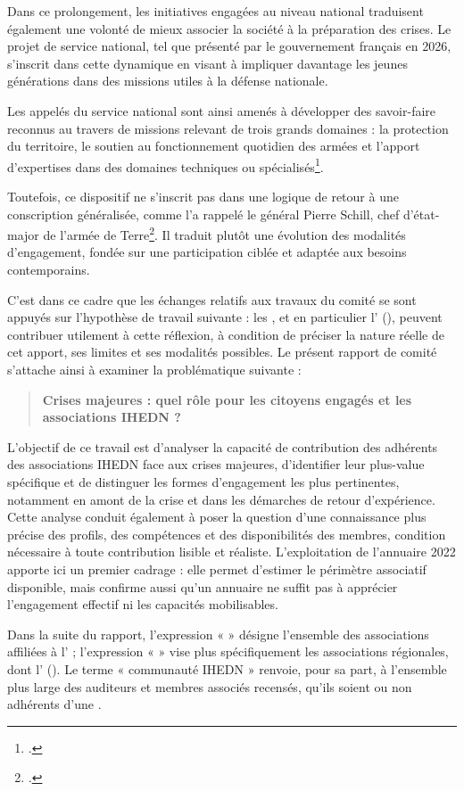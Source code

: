 Dans ce prolongement, les initiatives engagées au niveau national traduisent également une volonté de mieux associer la société à la préparation des crises. Le projet de service national, tel que présenté par le gouvernement français en 2026, s'inscrit dans cette dynamique en visant à impliquer davantage les jeunes générations dans des missions utiles à la défense nationale.

Les appelés du service national sont ainsi amenés à développer des savoir-faire reconnus au travers de missions relevant de trois grands domaines : la protection du territoire, le soutien au fonctionnement quotidien des armées et l'apport d'expertises dans des domaines techniques ou spécialisés\footcite{info_gouv_service_national}.

Toutefois, ce dispositif ne s'inscrit pas dans une logique de retour à une conscription généralisée, comme l'a rappelé le général Pierre Schill, chef d'état-major de l'armée de Terre\footcite{leparisien_schill_service_national}. Il traduit plutôt une évolution des modalités d'engagement, fondée sur une participation ciblée et adaptée aux besoins contemporains.

C'est dans ce cadre que les échanges relatifs aux travaux du comité se sont appuyés sur l'hypothèse de travail suivante : les \AssociationsUnionIHEDN, et en particulier l'\AssociationRegionaleIDF{} (\ARSeize), peuvent contribuer utilement à cette réflexion, à condition de préciser la nature réelle de cet apport, ses limites et ses modalités possibles. Le présent rapport de comité s'attache ainsi à examiner la problématique suivante :

\begin{quote}
\textbf{Crises majeures : quel rôle pour les citoyens engagés et les associations IHEDN ?}
\end{quote}

L'objectif de ce travail est d'analyser la capacité de contribution des adhérents des associations IHEDN face aux crises majeures, d'identifier leur plus-value spécifique et de distinguer les formes d'engagement les plus pertinentes, notamment en amont de la crise et dans les démarches de retour d'expérience. Cette analyse conduit également à poser la question d'une connaissance plus précise des profils, des compétences et des disponibilités des membres, condition nécessaire à toute contribution lisible et réaliste. L'exploitation de l'annuaire 2022 apporte ici un premier cadrage : elle permet d'estimer le périmètre associatif disponible, mais confirme aussi qu'un annuaire ne suffit pas à apprécier l'engagement effectif ni les capacités mobilisables.

Dans la suite du rapport, l'expression « \AssociationsUnionIHEDN{} » désigne l'ensemble des associations affiliées à l'\UnionIHEDN{} ; l'expression « \AssociationsRegionalesIHEDN{} » vise plus spécifiquement les associations régionales, dont l'\AssociationRegionaleIDF{} (\ARSeize). Le terme « communauté IHEDN » renvoie, pour sa part, à l'ensemble plus large des auditeurs et membres associés recensés, qu'ils soient ou non adhérents d'une \AssociationUnionIHEDN.
